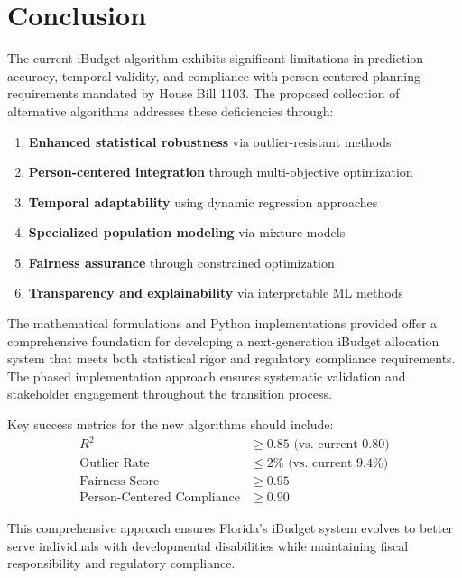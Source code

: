 \documentclass[12pt]{article}
\begin{document}
\section{Conclusion}

The current iBudget algorithm exhibits significant limitations in prediction accuracy, temporal validity, and compliance with person-centered planning requirements mandated by House Bill 1103. The proposed collection of alternative algorithms addresses these deficiencies through:

\begin{enumerate}
    \item \textbf{Enhanced statistical robustness} via outlier-resistant methods
    \item \textbf{Person-centered integration} through multi-objective optimization
    \item \textbf{Temporal adaptability} using dynamic regression approaches  
    \item \textbf{Specialized population modeling} via mixture models
    \item \textbf{Fairness assurance} through constrained optimization
    \item \textbf{Transparency and explainability} via interpretable ML methods
\end{enumerate}

The mathematical formulations and Python implementations provided offer a comprehensive foundation for developing a next-generation iBudget allocation system that meets both statistical rigor and regulatory compliance requirements. The phased implementation approach ensures systematic validation and stakeholder engagement throughout the transition process.

Key success metrics for the new algorithms should include:
\begin{align}
R^2 &\geq 0.85 \text{ (vs. current 0.80)} \\
\text{Outlier Rate} &\leq 2\% \text{ (vs. current 9.4\%)} \\
\text{Fairness Score} &\geq 0.95 \\
\text{Person-Centered Compliance} &\geq 0.90
\end{align}

This comprehensive approach ensures Florida's iBudget system evolves to better serve individuals with developmental disabilities while maintaining fiscal responsibility and regulatory compliance.
\end{document}
